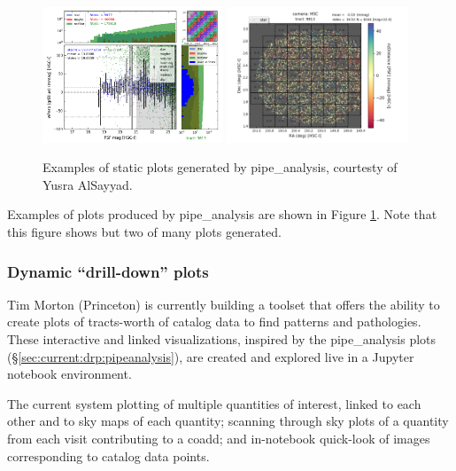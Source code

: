 \documentclass[DM,authoryear,toc,lsstdraft]{lsstdoc}
\begin{document}
\begin{figure}
\begin{center}
\includegraphics[width=0.48\textwidth]{figures/plot-t9813-color_wPerp-psfMagHist.png}
\includegraphics[width=0.48\textwidth]{figures/plot-t9813-rizDistancePSF-sky-stars.png}
\end{center}
\caption{Examples of static plots generated by pipe\_analysis, courtesty of Yusra
AlSayyad.}
\label{fig:pipeanalysis}
\end{figure}

Examples of plots produced by pipe\_analysis are shown in Figure
\ref{fig:pipeanalysis}. Note that this figure shows but two of many plots
generated.

\subsubsection{Dynamic ``drill-down'' plots}
\label{sec:current:drp:drilldown}

Tim Morton (Princeton) is currently building a toolset that offers the ability
to create plots of tracts-worth of catalog data to find patterns and
pathologies. These interactive and linked visualizations, inspired by the
pipe\_analysis plots (\S\ref{sec:current:drp:pipeanalysis}), are created and
explored live in a Jupyter notebook environment.

The current system plotting of multiple quantities of interest, linked to each
other and to sky maps of each quantity; scanning through sky plots of a
quantity from each visit contributing to a coadd; and in-notebook quick-look
of images corresponding to catalog data points.
\end{document}
